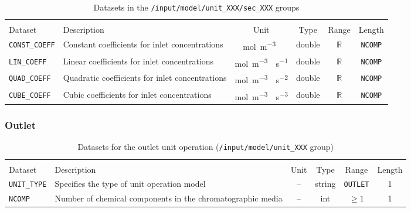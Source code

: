 \begin{table}[!ht]
\footnotesize
\begin{tabu}to \linewidth[m]{lX[m]cccc} \toprule
{} \\
\rowfont[c]\normalfont Dataset & Description & Unit & Type & Range & Length \everyrow{\midrule}\\
\texttt{CONST\_COEFF} & Constant coefficients for inlet concentrations & \si{\mol\per\cubic\metre{}} & double & $\mathds{R}$ & \texttt{NCOMP} \\
\texttt{LIN\_COEFF} & Linear coefficients for inlet concentrations & \si{\mol\per\cubic\metre{}\per\second} & double & $\mathds{R}$ & \texttt{NCOMP} \\
\texttt{QUAD\_COEFF} & Quadratic coefficients for inlet concentrations & \si{\mol\per\cubic\metre{}\per\square\second} & double & $\mathds{R}$ & \texttt{NCOMP} \\
\texttt{CUBE\_COEFF} & Cubic coefficients for inlet concentrations & \si{\mol\per\cubic\metre{}\per\cubic\second} & double & $\mathds{R}$ & \texttt{NCOMP} 
\everyrow{}\\
\bottomrule
\end{tabu}
\caption{\label{tab:FFModelInletPiecewiseCubicPoly}Datasets in the \texttt{/input/model/unit\_XXX/sec\_XXX} groups}
\end{table}

\FloatBarrier
\subsubsection{Outlet}

\begin{table}[!ht]
\footnotesize
\begin{tabu}to \linewidth[m]{lX[m]cccc} \toprule
{} \\
\rowfont[c]\normalfont Dataset & Description & Unit & Type & Range & Length \everyrow{\midrule}\\
\texttt{UNIT\_TYPE} & Specifies the type of unit operation model & -- & string & \texttt{OUTLET} & 1 \\
\texttt{NCOMP}& Number of chemical components in the chromatographic media & -- & int  & $\geq 1$ & 1
\everyrow{}\\
\bottomrule
\end{tabu}
\caption[Datasets for the outlet unit operation]{\label{tab:FFModelUnitOpOutlet}Datasets for the outlet unit operation (\texttt{/input/model/unit\_XXX} group)}
\end{table}

